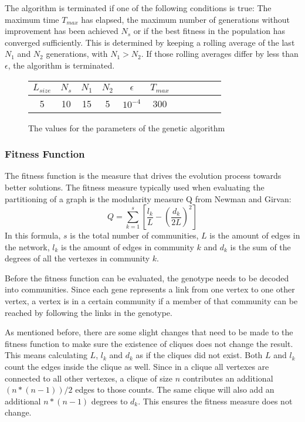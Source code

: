 \par
The algorithm is terminated if one of the following conditions is true: The maximum time $T_{max}$ has elapsed, the maximum number of generations without improvement has been achieved $N_{s}$ or if the best fitness in the population has converged sufficiently. This is determined by keeping a rolling average of the last $N_1$ and $N_2$ generations, with $N_1 > N_2$. If those rolling averages differ by less than $\epsilon$, the algorithm is terminated.
\begin{figure}[H]
\begin{center}
\begin{tabular}{ c c c c c c c c c c c}
 $L_{size}$ &  $N_{s}$ & $N_1$  & $N_2$ & $\epsilon$ & $T_{max}$ \\
 \hline  
  5 & 10 &  15 & 5 & $10^{-4}$ & 300
\end{tabular}
\caption{The values for the parameters of the genetic algorithm}
\end{center}
\end{figure}  
\subsubsection{Fitness Function}
The fitness function is the measure that drives the evolution process towards better solutions. The fitness measure typically used when evaluating the partitioning of a graph is the modularity measure Q from Newman and Girvan\cite{Newman2004}:
\begin{equation}
Q = \sum_{k=1}^{s} \left[ \frac{l_{k}}{L} - \left( \frac{d_{k}}{2L} \right)^{2} \right]
\end{equation}
In this formula, $s$ is the total number of communities, $L$ is the amount of edges in the network, $l_{k}$ is the amount of edges in community $k$ and $d_{k}$ is the sum of the degrees of all the vertexes in community $k$.
\par
Before the fitness function can be evaluated, the genotype needs to be decoded into communities. Since each gene represents a link from one vertex to one other vertex, a vertex is in a certain community if a member of that community can be reached by following the links in the genotype.
\par
As mentioned before, there are some slight changes that need to be made to the fitness function to make sure the existence of cliques does not change the result. This means calculating $L$, $l_{k}$ and $d_{k}$ as if the cliques did not exist. Both $L$ and $l_{k}$ count the edges inside the clique as well. Since in a clique all vertexes are connected to all other vertexes, a clique of size $n$ contributes an additional $ (n * (n - 1))/2 $ edges to those counts. The same clique will also add an additional $n * (n - 1)$ degrees to $d_{k}$. This ensures the fitness measure does not change.
